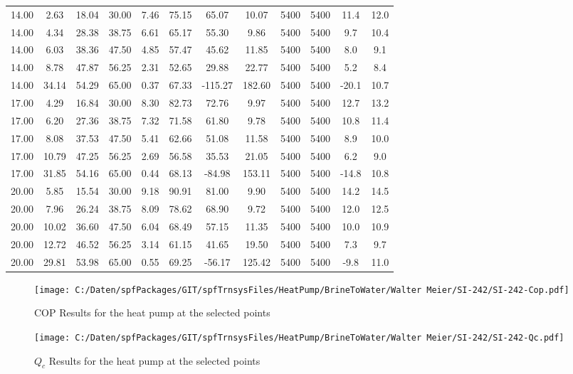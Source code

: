 \documentclass[english]{SPFShortReport}
\begin{document}
\begin{table}[!ht]
\begin{small}
\begin{center}
{\begin{tabular}{l | c c c c c c c c c c c }
14.00 & 2.63 & 18.04 & 30.00 & 7.46 & 75.15 & 65.07 & 10.07 & 5400 & 5400 & 11.4 & 12.0\\ 
14.00 & 4.34 & 28.38 & 38.75 & 6.61 & 65.17 & 55.30 & 9.86 & 5400 & 5400 & 9.7 & 10.4\\ 
14.00 & 6.03 & 38.36 & 47.50 & 4.85 & 57.47 & 45.62 & 11.85 & 5400 & 5400 & 8.0 & 9.1\\ 
14.00 & 8.78 & 47.87 & 56.25 & 2.31 & 52.65 & 29.88 & 22.77 & 5400 & 5400 & 5.2 & 8.4\\ 
14.00 & 34.14 & 54.29 & 65.00 & 0.37 & 67.33 & -115.27 & 182.60 & 5400 & 5400 & -20.1 & 10.7\\ 
17.00 & 4.29 & 16.84 & 30.00 & 8.30 & 82.73 & 72.76 & 9.97 & 5400 & 5400 & 12.7 & 13.2\\ 
17.00 & 6.20 & 27.36 & 38.75 & 7.32 & 71.58 & 61.80 & 9.78 & 5400 & 5400 & 10.8 & 11.4\\ 
17.00 & 8.08 & 37.53 & 47.50 & 5.41 & 62.66 & 51.08 & 11.58 & 5400 & 5400 & 8.9 & 10.0\\ 
17.00 & 10.79 & 47.25 & 56.25 & 2.69 & 56.58 & 35.53 & 21.05 & 5400 & 5400 & 6.2 & 9.0\\ 
17.00 & 31.85 & 54.16 & 65.00 & 0.44 & 68.13 & -84.98 & 153.11 & 5400 & 5400 & -14.8 & 10.8\\ 
20.00 & 5.85 & 15.54 & 30.00 & 9.18 & 90.91 & 81.00 & 9.90 & 5400 & 5400 & 14.2 & 14.5\\ 
20.00 & 7.96 & 26.24 & 38.75 & 8.09 & 78.62 & 68.90 & 9.72 & 5400 & 5400 & 12.0 & 12.5\\ 
20.00 & 10.02 & 36.60 & 47.50 & 6.04 & 68.49 & 57.15 & 11.35 & 5400 & 5400 & 10.0 & 10.9\\ 
20.00 & 12.72 & 46.52 & 56.25 & 3.14 & 61.15 & 41.65 & 19.50 & 5400 & 5400 & 7.3 & 9.7\\ 
20.00 & 29.81 & 53.98 & 65.00 & 0.55 & 69.25 & -56.17 & 125.42 & 5400 & 5400 & -9.8 & 11.0\\ 
\hline
\hline
\end{tabular}
}
\label{ResultsTable}
\end{center}
\end{small}
\end{table}
\begin{figure}[!ht]
\begin{center}
\texttt{[image: C:/Daten/spfPackages/GIT/spfTrnsysFiles/HeatPump/BrineToWater/Walter Meier/SI-242/SI-242-Cop.pdf]}
\caption{COP Results for the heat pump at the selected points}
\label{COPFig}
\end{center}
\end{figure}
\begin{figure}[!ht]
\begin{center}
\texttt{[image: C:/Daten/spfPackages/GIT/spfTrnsysFiles/HeatPump/BrineToWater/Walter Meier/SI-242/SI-242-Qc.pdf]}
\caption{$Q_c$ Results for the heat pump at the selected points}
\label{QcFig}
\end{center}
\end{figure}
\end{document}
